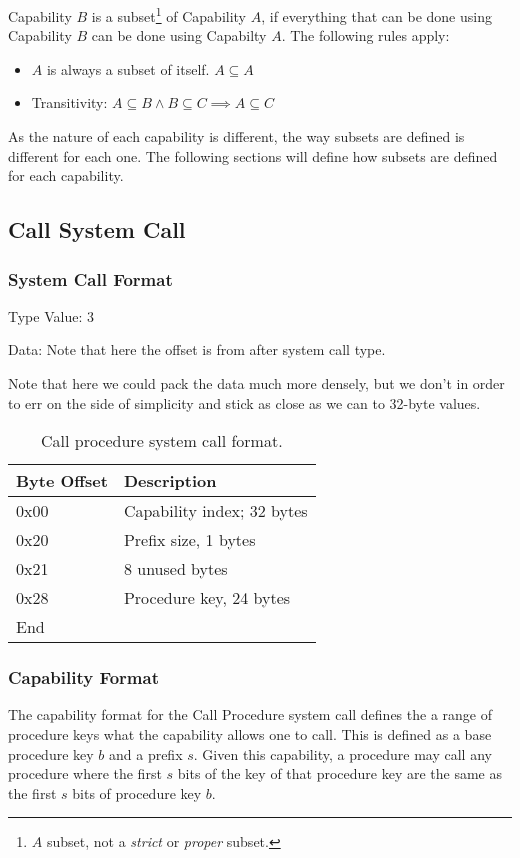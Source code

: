 \documentclass[english,a4paper]{article}
\let\oldparagraph\subsubsection
\renewcommand{\subsubsection}[1]{\oldparagraph{#1}\mbox{}}
\begin{document}
Capability $B$ is a subset\footnote{$A$ subset, not a \emph{strict} or
\emph{proper} subset.} of Capability $A$, if everything that can be done using
Capability $B$ can be done using Capabilty $A$. The following rules apply:

\begin{itemize}
  \item $A$ is always a subset of itself. $A \subseteq A$
  \item Transitivity: $A \subseteq B \land B \subseteq C \implies A
  \subseteq C$
\end{itemize}

As the nature of each capability is different, the way subsets are defined is
different for each one. The following sections will define how subsets are
defined for each capability.

\subsection{Call System Call}

\subsubsection{System Call Format}
Type Value: 3

Data: Note that here the offset is from after system call type.

Note that here we could pack the data much more densely, but we don't in order
to err on the side of simplicity and stick as close as we can to 32-byte values.

\begin{table}[H]
  \caption{Call procedure system call format.}
  \centering{}%
  \begin{tabular}{l|p{}}
    \hline
    Byte Offset & Description\tabularnewline
    \hline
    \hline
    0x00 & Capability index; 32 bytes \tabularnewline
    0x20 & Prefix size, 1 bytes \tabularnewline
    0x21 & 8 unused bytes \tabularnewline
    0x28 & Procedure key, 24 bytes \tabularnewline
    \hline
    End &  \tabularnewline
    \hline
  \end{tabular}
\end{table}

\subsubsection{Capability Format}
The capability format for the Call Procedure system call defines the a range of
procedure keys what the capability allows one to call. This is defined as a base
procedure key $b$ and a prefix $s$. Given this capability, a procedure may call
any procedure where the first $s$ bits of the key of that procedure key are the
same as the first $s$ bits of procedure key $b$.
\end{document}

